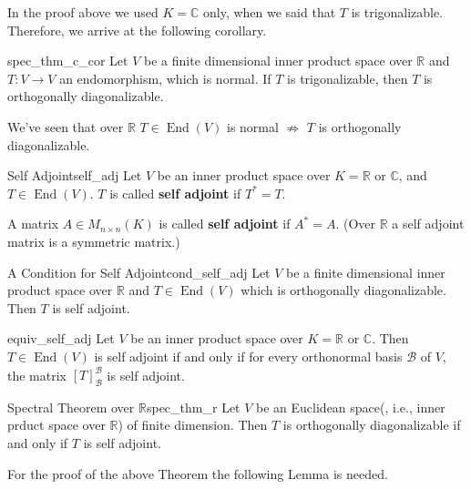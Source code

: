 \begin{remark}
	In the proof above we used $K = \mathbb{C}$ only, when we said that $T$ is trigonalizable. Therefore, we arrive at the following corollary.
\end{remark}

\begin{corollary}{}{spec_thm_c_cor}
	Let $V$ be a finite dimensional inner product space over $\mathbb{R}$ and $T:V \to V$ an endomorphism, which is normal. If $T$ is trigonalizable, then $T$ is orthogonally diagonalizable.
\end{corollary}

We've seen that over $\mathbb{R}$ $T \in \operatorname{End}(V)$ is normal $\not\Longrightarrow$ $T$ is orthogonally diagonalizable.

\begin{definition}{Self Adjoint}{self_adj}
	Let $V$ be an inner product space over $K = \mathbb{R}$ or $\mathbb{C}$, and $T \in \operatorname{End}(V)$. $T$ is called \textbf{self adjoint} if $T^* = T$.
	
	A matrix $A\in M_{n\times n}(K)$ is called \textbf{self adjoint} if $A^* = A$. (Over $\mathbb{R}$ a self adjoint matrix is a symmetric matrix.) 
\end{definition}

\begin{lemma}{A Condition for Self Adjoint}{cond_self_adj}
	Let $V$ be a finite dimensional inner product space over $\mathbb{R}$ and $T \in \operatorname{End}(V)$ which is orthogonally diagonalizable. Then $T$ is self adjoint.
\end{lemma}

\begin{lemma}{}{equiv_self_adj}
	Let $V$ be an inner product space over $K = \mathbb{R}$ or $\mathbb{C}$. Then $T \in \operatorname{End}(V)$ is self adjoint if and only if for every orthonormal basis $\mathcal{B}$ of $V$, the matrix $[T]^{\mathcal{B}}_{\mathcal{B}}$ is self adjoint.
\end{lemma}

\begin{theorem}{Spectral Theorem over $\mathbb{R}$}{spec_thm_r}
	Let $V$ be an Euclidean space(, i.e., inner prduct space over $\mathbb{R}$) of finite dimension. Then $T$ is orthogonally diagonalizable if and only if $T$ is self adjoint.
\end{theorem}

For the proof of the above Theorem the following Lemma is needed.


